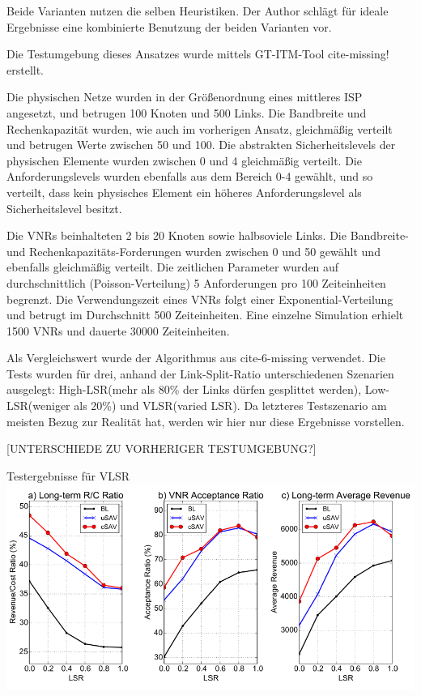 \documentclass{lni}
\begin{document}
Beide Varianten nutzen die selben Heuristiken. Der Author schlägt für ideale Ergebnisse eine kombinierte Benutzung der beiden Varianten vor.

Die Testumgebung dieses Ansatzes wurde mittels GT-ITM-Tool cite-missing! erstellt. 

Die physischen Netze wurden in der Größenordnung eines mittleres ISP angesetzt, und betrugen 100 Knoten und 500 Links. Die Bandbreite und Rechenkapazität wurden, wie auch im vorherigen Ansatz, gleichmäßig verteilt und betrugen Werte zwischen 50 und 100. Die abstrakten Sicherheitslevels der physischen Elemente wurden zwischen 0 und 4 gleichmäßig verteilt. Die Anforderungslevels wurden ebenfalls aus dem Bereich 0-4 gewählt, und so verteilt, dass kein physisches Element ein höheres Anforderungslevel als Sicherheitslevel besitzt.

Die VNRs beinhalteten 2 bis 20 Knoten sowie halbsoviele Links. Die Bandbreite- und Rechenkapazitäts-Forderungen wurden zwischen 0 und 50 gewählt und ebenfalls gleichmäßig verteilt.
Die zeitlichen Parameter wurden auf durchschnittlich (Poisson-Verteilung) 5 Anforderungen pro 100 Zeiteinheiten begrenzt. Die Verwendungszeit eines VNRs folgt einer Exponential-Verteilung und betrugt im Durchschnitt 500 Zeiteinheiten. Eine einzelne Simulation erhielt 1500 VNRs und dauerte 30000 Zeiteinheiten. 

Als Vergleichswert wurde der Algorithmus aus cite-6-missing verwendet. Die Tests wurden für drei, anhand der Link-Split-Ratio unterschiedenen Szenarien ausgelegt: 
High-LSR(mehr als 80\% der Links dürfen gesplittet werden),
Low-LSR(weniger als 20\%) und VLSR(varied LSR). Da letzteres Testszenario am meisten Bezug zur Realität hat, werden wir hier nur diese Ergebnisse vorstellen. 

[UNTERSCHIEDE ZU VORHERIGER TESTUMGEBUNG?]

\begin{center}
Testergebnisse für VLSR
	\includegraphics[width=1\textwidth]{perf_algo2.pdf}\newline
\end{center}
\end{document}
